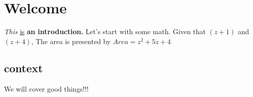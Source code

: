 \documentclass[11pt]{article}
\begin{document}
\section {Welcome}
\textit{This} \underline{is} \textbf{an introduction.}
Let's start with some math. Given that $(z+1)$ and $(z+4)$,
The area is presented by $Area=z^2+5z+4$
\subsection[10]{context} We will cover good things!!!
\end{document}
